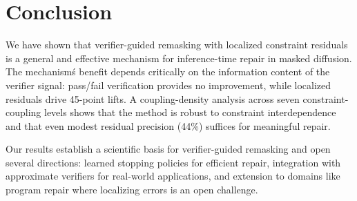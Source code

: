 \documentclass[11pt,a4paper,twoside]{article}
\theoremstyle{definition}
\begin{document}
\section{Conclusion}
\label{sec:conclusion}

We have shown that verifier-guided remasking with localized constraint residuals is a general and effective mechanism for inference-time repair in masked diffusion. The mechanism\'s benefit depends critically on the information content of the verifier signal: pass/fail verification provides no improvement, while localized residuals drive 45-point lifts. A coupling-density analysis across seven constraint-coupling levels shows that the method is robust to constraint interdependence and that even modest residual precision (44\%) suffices for meaningful repair.

Our results establish a scientific basis for verifier-guided remasking and open several directions: learned stopping policies for efficient repair, integration with approximate verifiers for real-world applications, and extension to domains like program repair where localizing errors is an open challenge.
\end{document}

